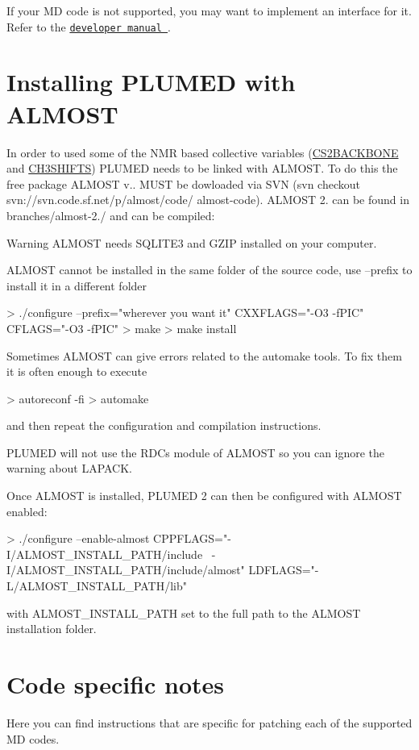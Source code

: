If your M\+D code is not supported, you may want to implement an interface for it. Refer to the \href{../../developer-doc/html/index.html}{\tt developer manual }.\hypertarget{_installation_installingalmost}{}\section{Installing P\+L\+U\+M\+E\+D with A\+L\+M\+O\+S\+T}\label{_installation_installingalmost}
In order to used some of the N\+M\+R based collective variables (\hyperlink{CS2BACKBONE}{C\+S2\+B\+A\+C\+K\+B\+O\+N\+E} and \hyperlink{CH3SHIFTS}{C\+H3\+S\+H\+I\+F\+T\+S}) P\+L\+U\+M\+E\+D needs to be linked with A\+L\+M\+O\+S\+T. To do this the free package A\+L\+M\+O\+S\+T v.. M\+U\+S\+T be dowloaded via S\+V\+N (svn checkout svn\+://svn.code.\+sf.\+net/p/almost/code/ almost-\/code). A\+L\+M\+O\+S\+T 2. can be found in branches/almost-\/2./ and can be compiled\+:

\begin{DoxyWarning}{Warning}
A\+L\+M\+O\+S\+T needs S\+Q\+L\+I\+T\+E3 and G\+Z\+I\+P installed on your computer. 

A\+L\+M\+O\+S\+T cannot be installed in the same folder of the source code, use --prefix to install it in a different folder
\end{DoxyWarning}
\begin{DoxyVerb}> ./configure --prefix="wherever you want it" CXXFLAGS="-O3 -fPIC" CFLAGS="-O3 -fPIC" 
> make
> make install
\end{DoxyVerb}


Sometimes A\+L\+M\+O\+S\+T can give errors related to the automake tools. To fix them it is often enough to execute \begin{DoxyVerb}> autoreconf -fi
> automake
\end{DoxyVerb}
 and then repeat the configuration and compilation instructions.

P\+L\+U\+M\+E\+D will not use the R\+D\+Cs module of A\+L\+M\+O\+S\+T so you can ignore the warning about L\+A\+P\+A\+C\+K.

Once A\+L\+M\+O\+S\+T is installed, P\+L\+U\+M\+E\+D 2 can then be configured with A\+L\+M\+O\+S\+T enabled\+:

\begin{DoxyVerb}> ./configure --enable-almost CPPFLAGS="-I/ALMOST_INSTALL_PATH/include \
  -I/ALMOST_INSTALL_PATH/include/almost" LDFLAGS="-L/ALMOST_INSTALL_PATH/lib"\end{DoxyVerb}
 with A\+L\+M\+O\+S\+T\+\_\+\+I\+N\+S\+T\+A\+L\+L\+\_\+\+P\+A\+T\+H set to the full path to the A\+L\+M\+O\+S\+T installation folder. \hypertarget{CodeSpecificNotes}{}\section{Code specific notes}\label{CodeSpecificNotes}
Here you can find instructions that are specific for patching each of the supported M\+D codes.


